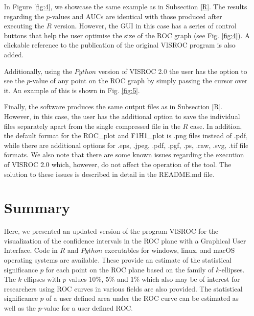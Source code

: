 \documentclass[preprint,12pt]{elsarticle}
\begin{document}
In Figure \ref{fig:4}, we showcase the same example as in Subsection \ref{R}. The results regarding the $p$-values and AUCs are identical with those produced after executing the $R$ version. However, the GUI in this case has a series of control buttons that help the user optimise the size of the ROC graph (see Fig. \ref{fig:4}). A clickable reference 
to the publication of the original VISROC program is also added. 

Additionally, using the $Python$ version of VISROC 2.0 the user has the option to see the $p$-value of any point on the ROC graph by simply passing the cursor over it. An example of this is shown in Fig. \ref{fig:5}.

Finally, the software produces the same output files as in Subsection \ref{R}. However, in this case, the user has the additional option to save the individual files separately apart from the single compressed file in the $R$ case. In addition, the default format for the ROC\_plot and F1H1\_plot is .png files instead of .pdf, while there are additional options for .eps, .jpeg, .pdf, .pgf, .ps, .raw, .svg, .tif file formats. We also note that there are some known issues regarding the execution of VISROC 2.0 which, however, do not affect the operation of the tool. The solution to these issues is described in detail in the README.md file.

\section{Summary}
Here, we presented an updated version of the program VISROC for the visualization of the confidence intervals in the ROC
plane with a Graphical User Interface. Code in $R$ and $Python$  executables for windows, linux, and macOS 
operating systems are available. 
These  provide an estimate of the statistical
significance $p$ for each point on the ROC plane based on the family of 
$k$-ellipses. The $k$-ellipses with
$p$-values 10\%, 5\% and 1\% which also may be of interest for researchers using
ROC curves in various fields are also provided. The statistical significance $p$ of a user defined
area under the ROC curve can be estimated as well as the $p$-value for a user defined ROC.    



\end{document}
